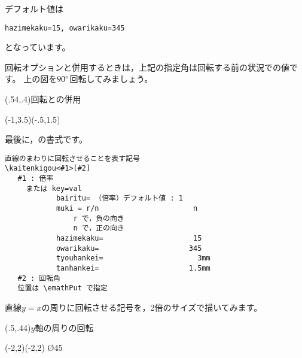 デフォルト値は
\begin{jquote}
\begin{verbatim}
hazimekaku=15, owarikaku=345
\end{verbatim}
\end{jquote}
となっています。

回転オプションと併用するときは，上記の指定角は回転する前の状況での値です。
上の図を$90^{\circ}$回転してみましょう。

\begin{showEx}(.54,.4){回転との併用}
\begin{zahyou}[ul=10mm]%
    (-1,3.5)(-.5,1.5)
\end{zahyou}
\end{showEx}

最後に，の書式です。

\begin{boxnote}
\begin{verbatim}
直線のまわりに回転させることを表す記号
\kaitenkigou<#1>[#2]
   #1 : 倍率
     または key=val
            bairitu= （倍率）デフォルト値 : 1
            muki = r/n                      n
                r で，負の向き
                n で，正の向き
            hazimekaku=                     15
            owarikaku=                     345
            tyouhankei=                      3mm
            tanhankei=                     1.5mm
   #2 : 回転角
   位置は \emathPut で指定
\end{verbatim}
\end{boxnote}

直線$y=x$の周りに回転させる記号を，2倍のサイズで描いてみます。

\begin{showEx}(.5,.44){$y$軸の周りの回転}
\begin{zahyou}[ul=10mm](-2,2)(-2,2)
\kTyokusen\O{45}{}{}
\end{zahyou}
\end{showEx}

